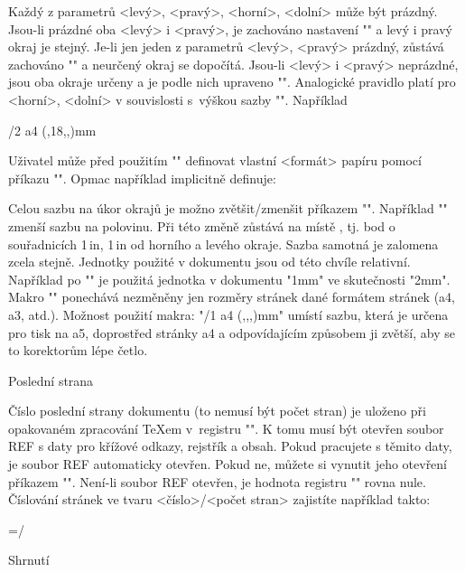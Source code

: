 Každý z parametrů <levý>, <pravý>, <horní>, <dolní> může být prázdný.
Jsou-li prázdné oba <levý> i <pravý>, je zachováno nastavení "\hsize" a
levý i pravý okraj je stejný. Je-li jen jeden z parametrů
<levý>, <pravý> prázdný, zůstává zachováno "\hsize" a neurčený okraj se
dopočítá. Jsou-li <levý> i <pravý> neprázdné, jsou oba okraje určeny 
a je podle nich upraveno "\hsize". 
Analogické pravidlo platí pro <horní>, <dolní> v souvislosti 
s~výškou sazby "\vsize". Například

\begtt
\margins/2 a4 (,18,,)mm  %
\endtt

Uživatel může před použitím "\margins" definovat vlastní <formát> papíru pomocí
příkazu "". 
Opmac například implicitně definuje:

\begtt
{}   
   
\endtt

Celou sazbu na úkor okrajů je možno zvětšit/zmenšit příkazem
"\magscale[<factor>]". Například "\magscale[500]" zmenší sazbu na polovinu.
Při této změně zůstává na místě , tj. bod o souřadnicích
1\,in, 1\,in od horního a levého okraje. Sazba samotná je zalomena zcela
stejně. Jednotky
použité v dokumentu jsou od této chvíle relativní. Například po
"\magscale[2000]" je použitá jednotka v dokumentu "1mm" ve skutečnosti "2mm".
Makro "\magscale" ponechává nezměněny jen rozměry stránek dané formátem
stránek (a4, a3, atd.). Možnost použití
makra: "\magscale[1414] \margins/1 a4 (,,,)mm" umístí sazbu, která je určena
pro tisk na a5, doprostřed stránky a4 a odpovídajícím způsobem ji zvětší,
aby se to korektorům lépe četlo. 


\sec Poslední strana

Číslo poslední strany dokumentu (to nemusí být počet stran) je uloženo při
opakovaném zpracování \TeX{}em v~registru "\lastpage". K tomu musí být
otevřen soubor REF s daty pro křížové odkazy, rejstřík a obsah. Pokud
pracujete s těmito daty, je soubor REF automaticky otevřen. Pokud ne, 
můžete si vynutit jeho otevření příkazem "\openref".
Není-li soubor REF otevřen, je hodnota registru "\lastpage" rovna nule.
Číslování stránek ve tvaru <číslo>/<počet stran> zajistíte například takto:

\begtt
\footline={\hss \rm \thefontsize[10]\the\pageno/\the\lastpage \hss}
\endtt


\sec Shrnutí

